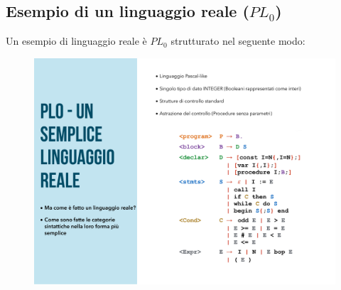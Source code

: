 \documentclass[a4paper]{article}
\begin{document}
	\subsection{Esempio di un linguaggio reale ($PL_{0}$)}\label{esempio di un linguaggio reale PL0}
	
	Un esempio di linguaggio reale è $PL_{0}$ strutturato nel seguente modo:
	\begin{figure}[!htp]
		\centering
		\includegraphics[width=.6\textwidth]{img/pl0.pdf}
	\end{figure}
	
\end{document}
